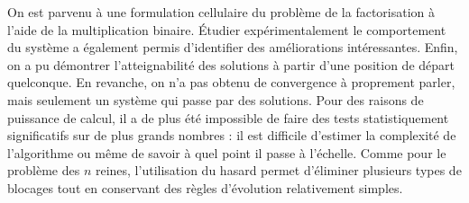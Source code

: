 
On est parvenu à une formulation cellulaire du problème de la factorisation à l'aide de la multiplication binaire. Étudier expérimentalement le comportement du système a également permis d'identifier des améliorations intéressantes. Enfin, on a pu démontrer l'atteignabilité des solutions à partir d'une position de départ quelconque. En revanche, on n'a pas obtenu de convergence à proprement parler, mais seulement un système qui passe par des solutions. Pour des raisons de puissance de calcul, il a de plus été impossible de faire des tests statistiquement significatifs sur de plus grands nombres : il est difficile d'estimer la complexité de l'algorithme ou même de savoir à quel point il passe à l'échelle. Comme pour le problème des $n$ reines, l'utilisation du hasard permet d'éliminer plusieurs types de blocages tout en conservant des règles d'évolution relativement simples.



